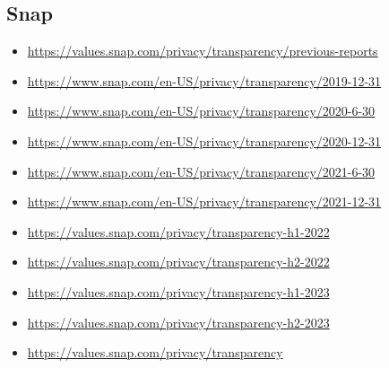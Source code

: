 {\subsection*{Snap}
{\footnotesize
\begin{itemize}
\item[]\url{https://values.snap.com/privacy/transparency/previous-reports}
\item[]\url{https://www.snap.com/en-US/privacy/transparency/2019-12-31}
\item[]\url{https://www.snap.com/en-US/privacy/transparency/2020-6-30}
\item[]\url{https://www.snap.com/en-US/privacy/transparency/2020-12-31}
\item[]\url{https://www.snap.com/en-US/privacy/transparency/2021-6-30}
\item[]\url{https://www.snap.com/en-US/privacy/transparency/2021-12-31}
\item[]\url{https://values.snap.com/privacy/transparency-h1-2022}
\item[]\url{https://values.snap.com/privacy/transparency-h2-2022}
\item[]\url{https://values.snap.com/privacy/transparency-h1-2023}
\item[]\url{https://values.snap.com/privacy/transparency-h2-2023}
\item[]\url{https://values.snap.com/privacy/transparency}
\end{itemize}
}


}
